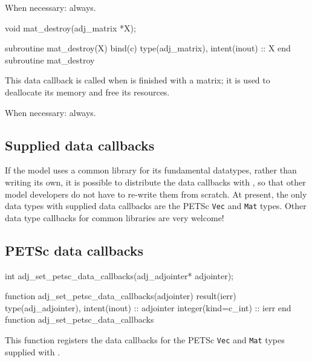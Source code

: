 When necessary: always.
\begin{framed}
\begin{minipage}{\columnwidth}
\begin{ccode}
  void mat_destroy(adj_matrix *X);
\end{ccode}
\begin{fortrancode}
  subroutine mat_destroy(X) bind(c)
    type(adj_matrix), intent(inout) :: X
  end subroutine mat_destroy
\end{fortrancode}
\end{minipage}
\end{framed}
This data callback is called when \libadjoint is finished
with a matrix; it is used to deallocate its memory and free
its resources.

When necessary: always.
\subsection{Supplied data callbacks}
If the model uses a common library for its fundamental datatypes, rather than
writing its own, it is possible to distribute the data callbacks with \libadjoint,
so that other model developers do not have to re-write them from scratch. At present, the
only data types with supplied data callbacks are the PETSc \texttt{Vec} and \texttt{Mat} types.
Other data type callbacks for common libraries are very welcome!

\subsection{PETSc data callbacks} \label{sec:petsc_callbacks}
\begin{framed}
\begin{minipage}{\columnwidth}
\begin{ccode}
  int adj_set_petsc_data_callbacks(adj_adjointer* adjointer);
\end{ccode}
\begin{fortrancode}
  function adj_set_petsc_data_callbacks(adjointer) result(ierr)
    type(adj_adjointer), intent(inout) :: adjointer
    integer(kind=c_int) :: ierr
  end function adj_set_petsc_data_callbacks
\end{fortrancode}
\end{minipage}
\end{framed}
This function registers the data callbacks for the PETSc \texttt{Vec} and \texttt{Mat} types
supplied with \libadjoint.


